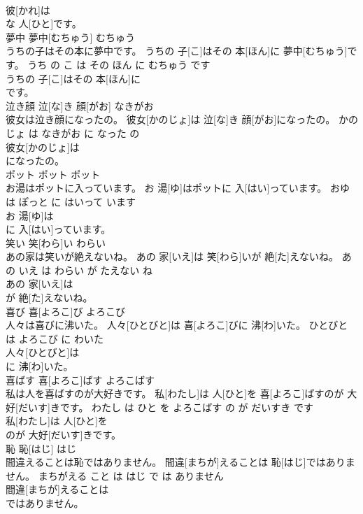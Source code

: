 \documentclass[8pt]{extreport}
\begin{document}
\begin{CJK}{UTF8}{min}
\\	彼[かれ]は
\\	な 人[ひと]です。			
\\	夢中	夢中[むちゅう]	むちゅう	
\\	うちの子はその本に夢中です。	うちの 子[こ]はその 本[ほん]に 夢中[むちゅう]です。	うち の こ は その ほん に むちゅう です	
\\	うちの 子[こ]はその 本[ほん]に
\\	です。			
\\	泣き顔	泣[な]き 顔[がお]	なきがお	
\\	彼女は泣き顔になったの。	彼女[かのじょ]は 泣[な]き 顔[がお]になったの。	かのじょ は なきがお に なった の	
\\	彼女[かのじょ]は
\\	になったの。			
\\	ポット	ポット	ポット	
\\	お湯はポットに入っています。	お 湯[ゆ]はポットに 入[はい]っています。	おゆ は ぽっと に はいって います	
\\	お 湯[ゆ]は
\\	に 入[はい]っています。			
\\	笑い	笑[わら]い	わらい	
\\	あの家は笑いが絶えないね。	あの 家[いえ]は 笑[わら]いが 絶[た]えないね。	あの いえ は わらい が たえない ね	
\\	あの 家[いえ]は
\\	が 絶[た]えないね。			
\\	喜び	喜[よろこ]び	よろこび	
\\	人々は喜びに沸いた。	人々[ひとびと]は 喜[よろこ]びに 沸[わ]いた。	ひとびと は よろこび に わいた	
\\	人々[ひとびと]は
\\	に 沸[わ]いた。			
\\	喜ばす	喜[よろこ]ばす	よろこばす	
\\	私は人を喜ばすのが大好きです。	私[わたし]は 人[ひと]を 喜[よろこ]ばすのが 大好[だいす]きです。	わたし は ひと を よろこばす の が だいすき です	
\\	私[わたし]は 人[ひと]を
\\	のが 大好[だいす]きです。			
\\	恥	恥[はじ]	はじ	
\\	間違えることは恥ではありません。	間違[まちが]えることは 恥[はじ]ではありません。	まちがえる こと は はじ で は ありません	
\\	間違[まちが]えることは
\\	ではありません。			

\end{CJK}
\end{document}
